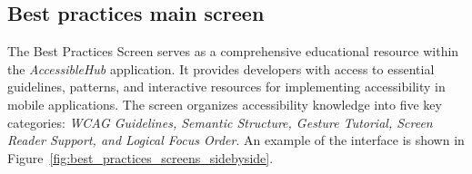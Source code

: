 \subsection{Best practices main screen}

The Best Practices Screen serves as a comprehensive educational resource within the \textit{AccessibleHub} application. It provides developers with access to essential guidelines, patterns, and interactive resources for implementing accessibility in mobile applications. The screen organizes accessibility knowledge into five key categories: \textit{WCAG Guidelines, Semantic Structure, Gesture Tutorial, Screen Reader Support, and Logical Focus Order}. An example of the interface is shown in Figure~\ref{fig:best_practices_screens_sidebyside}.

\begin{figure}[ht]
    \centering
    \begin{subfigure}[b]{0.48\textwidth}
        \centering

\end{subfigure}
\end{figure}
